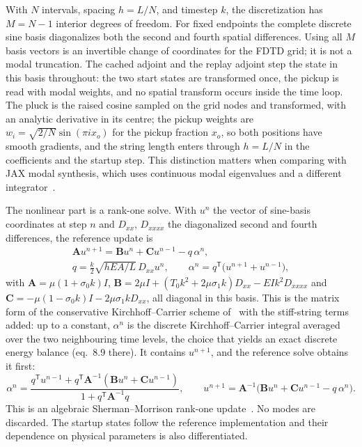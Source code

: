\documentclass[a4paper,10pt]{article}
\begin{document}
With $N$ intervals, spacing $h=L/N$, and timestep $k$, the discretization has $M=N-1$ interior degrees of freedom. For fixed endpoints the complete discrete sine basis diagonalizes both the second and fourth spatial differences. Using all $M$ basis vectors is an invertible change of coordinates for the FDTD grid; it is not a modal truncation. The cached adjoint and the replay adjoint step the state in this basis throughout: the two start states are transformed once, the pickup is read with modal weights, and no spatial transform occurs inside the time loop. The pluck is the raised cosine sampled on the grid nodes and transformed, with an analytic derivative in its centre; the pickup weights are $w_i=\sqrt{2/N}\sin(\pi i x_o)$ for the pickup fraction $x_o$, so both positions have smooth gradients, and the string length enters through $h=L/N$ in the coefficients and the startup step. This distinction matters when comparing with JAX modal synthesis, which uses continuous modal eigenvalues and a different integrator\ \cite{diaz2025}.

The nonlinear part is a rank-one solve. With $u^{n}$ the vector of sine-basis coordinates at step $n$ and $D_{xx}$, $D_{xxxx}$ the diagonalized second and fourth differences, the reference update is
\begin{equation}
 \begin{gathered}
 \mathbf{A}u^{n+1}=\mathbf{B}u^{n}+\mathbf{C}u^{n-1}-q\,\alpha^n,\\
 q=\tfrac{k}{2}\sqrt{hEA/L}\,D_{xx}u^{n},\qquad
 \alpha^n=q^{\mathsf T}\big(u^{n+1}+u^{n-1}\big),
 \end{gathered}
 \label{eq:update}
\end{equation}
with $\mathbf{A}=\mu(1+\sigma_0k)I$, $\mathbf{B}=2\mu I+(T_0k^2+2\mu\sigma_1k)D_{xx}-EIk^2D_{xxxx}$ and $\mathbf{C}=-\mu(1-\sigma_0k)I-2\mu\sigma_1kD_{xx}$, all diagonal in this basis. This is the matrix form of the conservative Kirchhoff--Carrier scheme of\ \cite[eq.~8.11]{bilbao2009} with the stiff-string terms added: up to a constant, $\alpha^n$ is the discrete Kirchhoff--Carrier integral averaged over the two neighbouring time levels, the choice that yields an exact discrete energy balance (eq.~8.9 there). It contains $u^{n+1}$, and the reference solve obtains it first:
\begin{equation}
 \alpha^n=\frac{q^{\mathsf T}u^{n-1}+q^{\mathsf T}\mathbf{A}^{-1}(\mathbf{B}u^{n}+\mathbf{C}u^{n-1})}
                 {1+q^{\mathsf T}\mathbf{A}^{-1}q},\qquad
 u^{n+1}=\mathbf{A}^{-1}\big(\mathbf{B}u^{n}+\mathbf{C}u^{n-1}-q\,\alpha^n\big).
 \label{eq:step}
\end{equation}
This is an algebraic Sherman--Morrison rank-one update\ \cite{sherman1950}. No modes are discarded. The startup states follow the reference implementation and their dependence on physical parameters is also differentiated.
\end{document}
